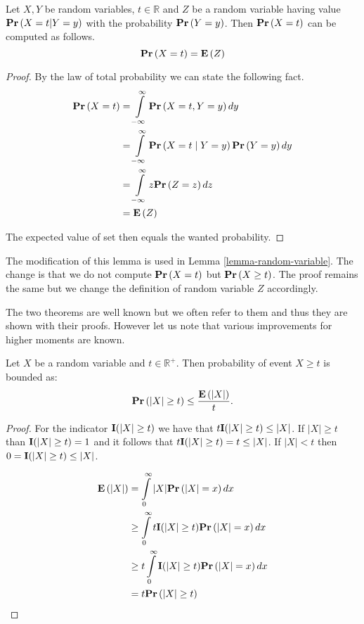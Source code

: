 \begin{lemma}
Let $X, Y$ be random variables, $t \in \mathbb{R}$ and $Z$ be a random variable having value $\mathbf{Pr}\left(X = t | Y = y\right)$ with the probability $\mathbf{Pr}\left(Y = y\right)$. Then $\mathbf{Pr}\left(X = t\right)$ can be computed as follows.
\[
\mathbf{Pr}\left(X = t\right) = \mathbf{E}\left(Z\right)
\]
\end{lemma}
\begin{proof}
By the law of total probability we can state the following fact.
\[
\begin{split}
\mathbf{Pr}\left(X = t\right) 
	& = \int\limits_{-\infty}^{\infty} \mathbf{Pr}\left(X = t, Y = y\right) dy \\
	& = \int\limits_{-\infty}^{\infty} \mathbf{Pr}\left(X = t \mid Y = y\right) \mathbf{Pr}\left(Y = y\right) dy \\
	& = \int\limits_{-\infty}^{\infty} z \mathbf{Pr}\left(Z = z\right) dz \\
	& = \mathbf{E}\left(Z\right) \\
\end{split}
\]

The expected value of set then equals the wanted probability.
\end{proof}

The modification of this lemma is used in Lemma \ref{lemma-random-variable}. The change is that we do not compute $\mathbf{Pr}\left(X = t\right)$ but $\mathbf{Pr}\left(X \geq t\right)$. The proof remains the same but we change the definition of random variable $Z$ accordingly.


The two theorems are well known but we often refer to them and thus they are shown with their proofs. However let us note that various improvements for higher moments are known.
\begin{theorem}
Let $X$ be a random variable and $t \in \mathbb{R}^{+}$. Then probability of event $X \geq t$ is bounded as:
\[
\mathbf{Pr}\left(|X| \geq t\right) \leq \frac{\mathbf{E}\left(|X|\right)}{t} \text{.}
\]
\end{theorem}
\begin{proof}
For the indicator $\mathbf{I}(|X| \geq t)$ we have that $t\mathbf{I}(|X| \geq t) \leq |X|$. If $|X| \geq t$ than $\mathbf{I}(|X| \geq t) = 1$ and it follows that $t\mathbf{I}(|X| \geq t) = t \leq |X|$. If $|X| < t$ then $0 = \mathbf{I}(|X| \geq t) \leq |X|$.

\[
\begin{split}
\mathbf{E}\left(|X|\right) 
	& = \int\limits_{0}^{\infty} |X| \mathbf{Pr}\left(|X| = x\right) dx \\
	& \geq \int\limits_{0}^{\infty} t \mathbf{I}(|X| \geq t) \mathbf{Pr}\left(|X| = x\right) dx \\
	& \geq t \int\limits_{0}^{\infty} \mathbf{I}(|X| \geq t) \mathbf{Pr}\left(|X| = x\right) dx \\
	& = t \mathbf{Pr}\left(|X| \geq t\right) \\
\end{split}
\]
\end{proof}

